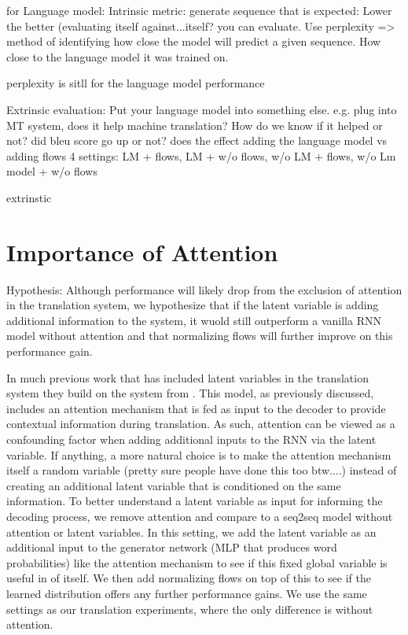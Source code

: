 for Language model:
Intrinsic metric: generate sequence that is expected: Lower the better (evaluating itself against...itself? you can evaluate. Use perplexity => method of identifying how close the model will predict a given sequence. How close to the language model it was trained on. 

perplexity is sitll for the language model performance

Extrinsic evaluation: Put your language model into something else. e.g. plug into MT system, does it help machine translation?
How do we know if it helped or not? did bleu score go up or not? 
does the effect adding the language model vs adding flows
4 settings: LM + flows, LM + w/o flows, w/o LM + flows, w/o Lm model + w/o flows


extrinstic
\section{Importance of Attention}

Hypothesis:  Although performance will likely drop from the exclusion of attention in the translation system, we hypothesize that if the latent variable is adding additional information to the system, it wuold still outperform a vanilla RNN model without attention and that normalizing flows will further improve on this performance gain.

In much previous work that has included latent variables in the translation system they build on the system from \cite{bahndanau et. al.} . This model, as previously discussed, includes an attention mechanism that is fed as input to the decoder to provide contextual information during translation. As such, attention can be viewed as a confounding factor when adding additional inputs to the RNN via the latent variable. If anything, a more natural choice is to make the attention mechanism itself a random variable (pretty sure people have done this too btw....) instead of creating an additional latent variable that is conditioned on the same information. To better understand a latent variable as input for informing the decoding process, we remove attention and compare to a seq2seq model without attention or latent variables. In this setting, we add the latent variable as an additional input to the generator network (MLP that produces word probabilities) like the attention mechanism to see if this fixed global variable is useful in of itself. We then add normalizing flows on top of this to see if the learned distribution offers any further performance gains. We use the same settings as our translation experiments, where the only difference is without attention.

